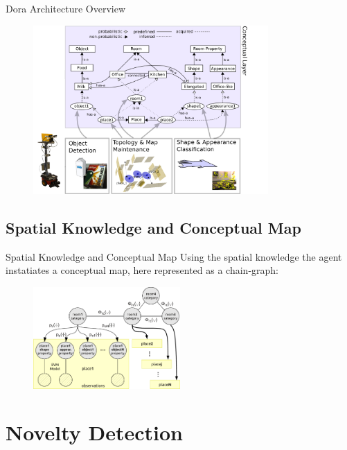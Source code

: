 \documentclass[compress]{beamer}
\begin{document}
\begin{frame}{Dora Architecture Overview}
  \begin{figure}
    \includegraphics[width=0.8\textwidth]{figures/processes.pdf}
  \end{figure}
\end{frame}

\subsection{Spatial Knowledge and Conceptual Map}
\begin{frame}{Spatial Knowledge and Conceptual Map}
    Using the spatial knowledge the agent instatiates a conceptual map, here represented as a chain-graph:
    \begin{figure}
      \includegraphics[width=0.5\textwidth]{figures/chaingraph.pdf}
    \end{figure}
\end{frame}


\section{Novelty Detection}
\end{document}
